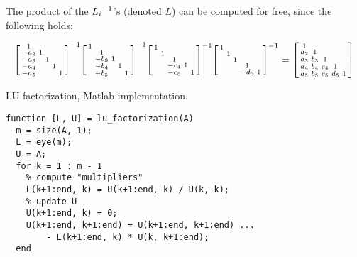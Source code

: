 \documentclass[ComputationalMathematics.tex]{subfiles}
\begin{document}
\begin{obs}\label{obs:21novstroke1}
  The product of the ${L_i}^{-1}$'s (denoted $L$) can be computed for free, since the following holds:

\begin{gather*}
\begin{bsmallmatrix}
    1 & \\
    -a_2 & 1 & \\
    -a_3 &  & 1  \\
    -a_4 &  & & 1  \\
    -a_5 &  &  & & 1 
\end{bsmallmatrix}^{-1}
\begin{bsmallmatrix}
    1 & \\
     & 1 & \\
     & -b_3 & 1  \\
     & -b_4 & & 1  \\
     & -b_5 &  & & 1 
\end{bsmallmatrix}^{-1}
\begin{bsmallmatrix}
    1 & \\
     & 1 & \\
     &  & 1  \\
     &  & -c_4& 1  \\
     &  & -c_5 & & 1 
\end{bsmallmatrix}^{-1} 
\begin{bsmallmatrix}
    1 & \\
     & 1 & \\
     &  & 1  \\
     &  & & 1  \\
     &  &  & -d_5& 1 
\end{bsmallmatrix}^{-1}
= \begin{bsmallmatrix}
    1 & \\
    a_2 & 1 & \\
    a_3 & b_3 & 1  \\
    a_4 & b_4 & c_4& 1  \\
    a_5 & b_5 & c_5 &d_5 & 1     
\end{bsmallmatrix}
\end{gather*}
\end{obs}

\begin{center}
\begin{minipage}{.9\linewidth}
  \begin{algorithm}[H]
    \caption{LU factorization, Matlab implementation.}\label{algo:21nov1}
    \begin{verbatim}
function [L, U] = lu_factorization(A)
  m = size(A, 1);
  L = eye(m);
  U = A;
  for k = 1 : m - 1
    % compute "multipliers"
    L(k+1:end, k) = U(k+1:end, k) / U(k, k);
    % update U 
    U(k+1:end, k) = 0;
    U(k+1:end, k+1:end) = U(k+1:end, k+1:end) ... 
        - L(k+1:end, k) * U(k, k+1:end);
  end
    \end{verbatim}
  \end{algorithm}
\end{minipage}
\end{center}
\vspace{0.5cm}
\end{document}
